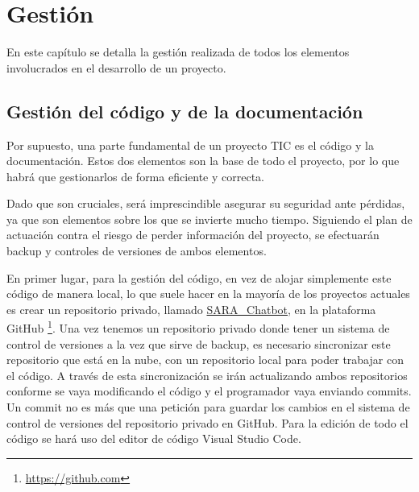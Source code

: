 \chapter{Gestión}

En este capítulo se detalla la gestión realizada de todos los elementos involucrados en el desarrollo de un proyecto.

\section{Gestión del código y de la documentación}

Por supuesto, una parte fundamental de un proyecto TIC es el código y la documentación. Estos dos elementos son la base de todo el proyecto, por lo que habrá que gestionarlos de forma eficiente y correcta.

Dado que son cruciales, será imprescindible asegurar su seguridad ante pérdidas, ya que son elementos sobre los que se invierte mucho tiempo. Siguiendo el plan de actuación contra el riesgo de perder información del proyecto, se efectuarán backup y controles de versiones de ambos elementos.

En primer lugar, para la gestión del código, en vez de alojar simplemente este código de manera local, lo que suele hacer en la mayoría de los proyectos actuales es crear un repositorio privado, llamado \href{https://github.com/Mario-Carmona/SARA_Chatbot}{SARA\_Chatbot}, en la plataforma GitHub \footnote{\url{https://github.com}}. Una vez tenemos un repositorio privado donde tener un sistema de control de versiones a la vez que sirve de backup, es necesario sincronizar este repositorio que está en la nube, con un repositorio local para poder trabajar con el código. A través de esta sincronización se irán actualizando ambos repositorios conforme se vaya modificando el código y el programador vaya enviando commits. Un commit no es más que una petición para guardar los cambios en el sistema de control de versiones del repositorio privado en GitHub. Para la edición de todo el código se hará uso del editor de código Visual Studio Code.

